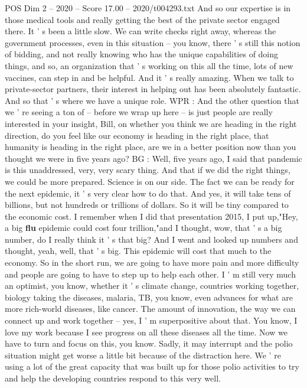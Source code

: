 \begin{textsample}{POS Dim 2 – 2020 – Score 17.00 – 2020/t004293.txt}
And so our expertise is in those medical tools and really getting the best of the private sector engaged there.
It ' s been a little slow.
We can write checks right away, whereas the government processes, even in this situation -- you know, there ' s still this notion of bidding, and not really knowing who has the unique capabilities of doing things, and so, an organization that ' s working on this all the time, lots of new vaccines, can step in and be helpful.
And it ' s really amazing.
When we talk to private-sector partners, their interest in helping out has been absolutely fantastic.
And so that ' s where we have a unique role.
WPR : And the other question that we ' re seeing a ton of -- before we wrap up here -- is just people are really interested in your insight, Bill, on whether you think we are heading in the right direction, do you feel like our economy is heading in the right place, that humanity is heading in the right place, are we in a better position now than you thought we were in five years ago?
BG : Well, five years ago, I said that pandemic is this unaddressed, very, very scary thing.
And that if we did the right things, we could be more prepared.
Science is on our side.
The fact we can be ready for the next epidemic, it ' s very clear how to do that.
And yes, it will take tens of billions, but not hundreds or trillions of dollars.
So it will be tiny compared to the economic cost.
I remember when I did that presentation 2015, I put up,"Hey, a big \textbf{flu} epidemic could cost four trillion,"and I thought, wow, that ' s a big number, do I really think it ' s that big?
And I went and looked up numbers and thought, yeah, well, that ' s big.
This epidemic will cost that much to the economy.
So in the short run, we are going to have more pain and more difficulty and people are going to have to step up to help each other.
I ' m still very much an optimist, you know, whether it ' s climate change, countries working together, biology taking the diseases, malaria, TB, you know, even advances for what are more rich-world diseases, like cancer.
The amount of innovation, the way we can connect up and work together -- yes, I ' m superpositive about that.
You know, I love my work because I see progress on all these diseases all the time.
Now we have to turn and focus on this, you know.
Sadly, it may interrupt and the polio situation might get worse a little bit because of the distraction here.
We ' re using a lot of the great capacity that was built up for those polio activities to try and help the developing countries respond to this very well.

\end{textsample}
